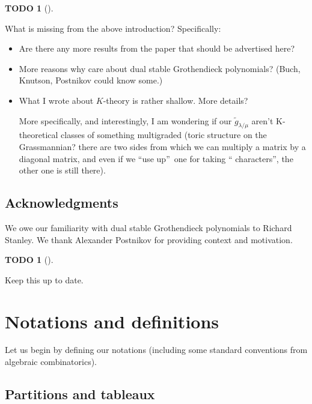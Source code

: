\documentclass[numbers=enddot,12pt,final,onecolumn,notitlepage]{scrartcl}%
\theoremstyle{definition}
\newtheorem{quest}[theo]{TODO}
\newenvironment{todo}[1][]
{\begin{quest}[#1]\begin{leftbar}}
{\end{leftbar}\end{quest}}
\begin{document}
\begin{todo}
What is missing from the above introduction? Specifically:

\begin{itemize}
\item Are there any more results from the paper that should be advertised here?

\item More reasons why care about dual stable Grothendieck polynomials? (Buch,
Knutson, Postnikov could know some.)

\item What I wrote about $K$-theory is rather shallow. More details?

More specifically, and interestingly, I am wondering if our $\widetilde{g}%
_{\lambda/\mu}$ aren't K-theoretical classes of something multigraded (toric
structure on the Grassmannian? there are two sides from which we can multiply
a matrix by a diagonal matrix, and even if we \textquotedblleft use
up\textquotedblright\ one for taking \textquotedblleft
characters\textquotedblright, the other one is still there).
\end{itemize}
\end{todo}

\subsection{Acknowledgments}

We owe our familiarity with dual stable Grothendieck polynomials to Richard
Stanley. We thank Alexander Postnikov for providing context and motivation.

\begin{todo}
Keep this up to date.
\end{todo}

\section{\label{sect.notations}Notations and definitions}

Let us begin by defining our notations (including some standard conventions
from algebraic combinatorics).

\subsection{Partitions and tableaux}
\end{document}
